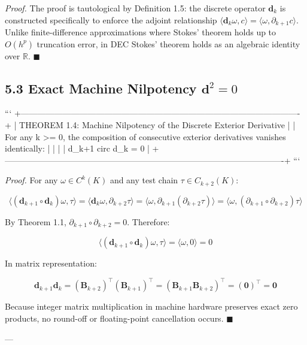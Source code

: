 \documentclass[11pt,twoside,openright]{amsbook}
\begin{document}
\textit{Proof.} The proof is tautological by Definition 1.5: the discrete operator $\mathbf{d}_k$ is constructed specifically to enforce the adjoint relationship $\langle \mathbf{d}_k \omega, c \rangle = \langle \omega, \partial_{k+1} c \rangle$. Unlike finite-difference approximations where Stokes' theorem holds up to $O(h^p)$ truncation error, in DEC Stokes' theorem holds as an algebraic identity over $\mathbb{R}$. $\blacksquare$

\subsection{5.3 Exact Machine Nilpotency $\mathbf{d}^2 = 0$}

```
+----------------------------------------------------------------------------------------------------+
| THEOREM 1.4: Machine Nilpotency of the Discrete Exterior Derivative                                |
| For any k >= 0, the composition of consecutive exterior derivatives vanishes identically:         |
|                                                                                                    |
|   d_{k+1} circ d_k = 0                                                                             |
+----------------------------------------------------------------------------------------------------+
```

\textit{Proof.} For any $\omega \in C^k(K)$ and any test chain $\tau \in C_{k+2}(K)$:

$$\langle (\mathbf{d}_{k+1} \circ \mathbf{d}_k) \omega, \tau \rangle = \langle \mathbf{d}_k \omega, \partial_{k+2} \tau \rangle = \langle \omega, \partial_{k+1} (\partial_{k+2} \tau) \rangle = \langle \omega, (\partial_{k+1} \circ \partial_{k+2}) \tau \rangle$$

By Theorem 1.1, $\partial_{k+1} \circ \partial_{k+2} = 0$. Therefore:

$$\langle (\mathbf{d}_{k+1} \circ \mathbf{d}_k) \omega, \tau \rangle = \langle \omega, 0 \rangle = 0$$

In matrix representation:

$$\mathbf{d}_{k+1} \mathbf{d}_k = (\mathbf{B}_{k+2})^\top (\mathbf{B}_{k+1})^\top = (\mathbf{B}_{k+1} \mathbf{B}_{k+2})^\top = (\mathbf{0})^\top = \mathbf{0}$$

Because integer matrix multiplication in machine hardware preserves exact zero products, no round-off or floating-point cancellation occurs. $\blacksquare$

---
\end{document}
